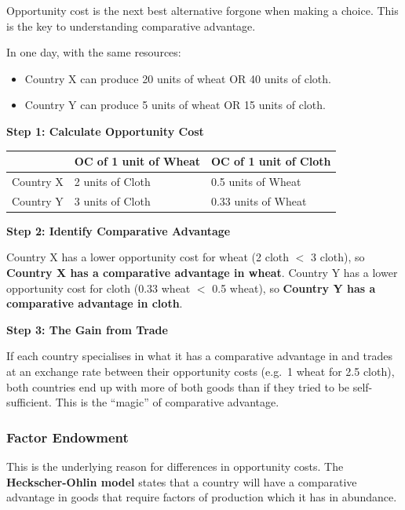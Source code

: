 \documentclass[11pt, a4paper, twoside]{book}
\begin{document}
Opportunity cost is the next best alternative forgone when making a choice. This is the key to understanding comparative advantage.

\begin{example}
In one day, with the same resources:
\begin{itemize}
  \item Country X can produce 20 units of wheat OR 40 units of cloth.
  \item Country Y can produce 5 units of wheat OR 15 units of cloth.
\end{itemize}

\medskip
\noindent\textbf{Step 1: Calculate Opportunity Cost}

\medskip
\begin{tabular}{@{}lll@{}}
 & \textbf{OC of 1 unit of Wheat} & \textbf{OC of 1 unit of Cloth} \\
\midrule
Country X & 2 units of Cloth & 0.5 units of Wheat \\
Country Y & 3 units of Cloth & 0.33 units of Wheat \\
\end{tabular}

\medskip
\noindent\textbf{Step 2: Identify Comparative Advantage}

Country X has a lower opportunity cost for wheat (2 cloth $<$ 3 cloth), so \textbf{Country X has a comparative advantage in wheat}. Country Y has a lower opportunity cost for cloth (0.33 wheat $<$ 0.5 wheat), so \textbf{Country Y has a comparative advantage in cloth}.

\medskip
\noindent\textbf{Step 3: The Gain from Trade}

If each country specialises in what it has a comparative advantage in and trades at an exchange rate between their opportunity costs (e.g.\ 1 wheat for 2.5 cloth), both countries end up with more of both goods than if they tried to be self-sufficient. This is the ``magic'' of comparative advantage.
\end{example}

\subsubsection{Factor Endowment}

This is the underlying reason for differences in opportunity costs. The \textbf{Heckscher-Ohlin model} states that a country will have a comparative advantage in goods that require factors of production which it has in abundance.
\end{document}
